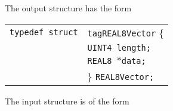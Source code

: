 \documentclass[12pt]{article}
\begin{document}
The output structure has the form

\vspace{5mm}

\begin{tabular}{ll}
\texttt{typedef struct} & \texttt{tagREAL8Vector} \{ \\
                        & \texttt{UINT4 length;} \\
                        & \texttt{REAL8 $\ast$data;}  \\
                        & \} \texttt{REAL8Vector;}
\end{tabular}

\vspace{5mm}

\vspace{5mm}


The input structure is of the form

\vspace{5mm}
\end{document}
